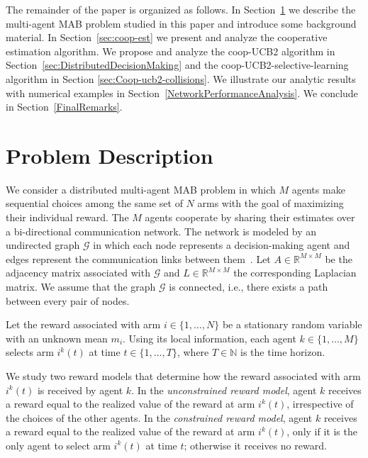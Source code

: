 \documentclass[final,5p,times,twocolumn]{elsarticle}
\theoremstyle{definition}
\def \mc {\mathcal}
\def\real{\mathbb{R}}
\def\naturals{\mathbb{N}}
\newcommand{\until}[1]{\{1,\dots, #1\}}
\begin{document}

The remainder of the paper is organized as follows.  In Section~\ref{sec:setup} we describe the multi-agent MAB problem studied in this paper and introduce some background material.  In Section~\ref{sec:coop-est} we present and analyze the cooperative estimation algorithm. We propose and analyze the coop-UCB2 algorithm in Section~\ref{sec:DistributedDecisionMaking} and the coop-UCB2-selective-learning algorithm in Section \ref{sec:Coop-ucb2-collisions}. We illustrate our analytic results with numerical examples in Section~\ref{NetworkPerformanceAnalysis}. We conclude in Section~\ref{FinalRemarks}.



\section{Problem Description} \label{sec:setup}
We consider a distributed multi-agent MAB problem in which $M$ agents make sequential choices among the same set of $N$ arms with the goal of maximizing their individual reward. The $M$ agents cooperate by sharing their estimates over a bi-directional communication network. The network is modeled by an undirected graph $\mathcal{G}$ in which each node represents a decision-making agent and edges represent the communication links between them~\cite{FB-JC-SM:09}. Let $A\in \real^{M\times M}$ be the adjacency matrix associated with $\mc G$ and  $L \in \real^{M\times M}$ the corresponding Laplacian matrix. We assume that the graph $\mc G$ is connected, i.e., there exists a path between every pair of nodes.

Let the reward associated with arm $i\in \until{N}$ be a stationary random variable with an unknown mean $m_i$.  Using its local information, each agent $k \in \until{M}$  selects arm $i^k(t)$ at time $t \in \until{T}$, where $T \in \naturals$ is the time horizon. 

We study two reward  models that determine how the reward associated with arm $i^k(t)$ is received by agent $k$. In the \emph{unconstrained reward model}, agent $k$ receives a reward equal to the realized value of the reward at arm $i^k(t)$, irrespective of the choices of the other agents. In the \emph{constrained reward model},  agent $k$ receives a reward equal to the realized value of the reward at arm $i^k(t)$, only if it  is the only agent to select arm $i^k(t)$ at time $t$; otherwise it receives no reward. 
\end{document}
